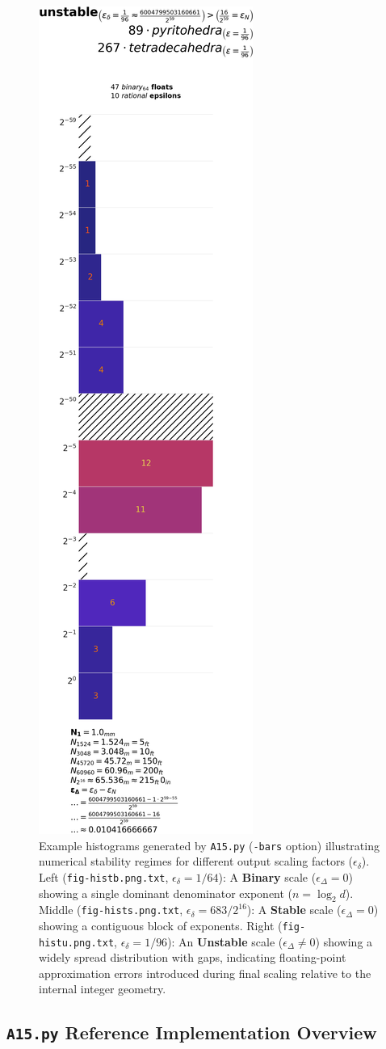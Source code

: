 \documentclass[10pt]{article}
\begin{document}
\begin{figure}[!htb]
    \includegraphics[width=.325\textwidth]{fig-histu}%
    \caption{Example histograms generated by \texttt{A15.py} (\texttt{-bars} option) illustrating numerical stability regimes for different output scaling factors ($\epsilon_\delta$). Left (\texttt{fig-histb.png.txt}, $\epsilon_\delta=1/64$): A \textbf{Binary} scale ($\epsilon_\Delta=0$) showing a single dominant denominator exponent ($n = \log_2 d$). Middle (\texttt{fig-hists.png.txt}, $\epsilon_\delta=683/2^{16}$): A \textbf{Stable} scale ($\epsilon_\Delta=0$) showing a contiguous block of exponents. Right (\texttt{fig-histu.png.txt}, $\epsilon_\delta=1/96$): An \textbf{Unstable} scale ($\epsilon_\Delta \neq 0$) showing a widely spread distribution with gaps, indicating floating-point approximation errors introduced during final scaling relative to the internal integer geometry.}
    \label{fig:hist}
\end{figure}

\subsection{\texttt{A15.py} Reference Implementation Overview}\label{subsec:implementation-a15py}
\end{document}

